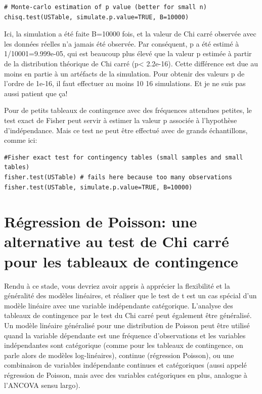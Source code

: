 \documentclass[12pt,]{book}
\begin{document}
\begin{verbatim}
# Monte-carlo estimation of p value (better for small n)
chisq.test(USTable, simulate.p.value=TRUE, B=10000)
\end{verbatim}

Ici, la simulation a été faite B=10000 fois, et la valeur de Chi carré
observée avec les données réelles n'a jamais été observée. Par
conséquent, p a été estimé à 1/10001=9.999e-05, qui est beaucoup
plus élevé que la valeur p estimée à partir de la distribution théorique
de Chi carré (p\textless{} 2.2e-16). Cette différence est due au moins en partie
à un artéfacts de la simulation. Pour obtenir des valeurs p de l'ordre de
1e-16, il faut effectuer au moins 10 16 simulations. Et je ne suis pas
aussi patient que ça!

Pour de petits tableaux de contingence avec des fréquences attendues
petites, le test exact de Fisher peut servir à estimer la valeur p associée
à l'hypothèse d'indépendance. Mais ce test ne peut être effectué avec
de grands échantillons, comme ici:

\begin{verbatim}
#Fisher exact test for contingency tables (small samples and small tables)
fisher.test(USTable) # fails here because too many observations
fisher.test(USTable, simulate.p.value=TRUE, B=10000)
\end{verbatim}

\hypertarget{ruxe9gression-de-poisson-une-alternative-au-test-de-chi-carruxe9-pour-les-tableaux-de-contingence}{%
\section{Régression de Poisson: une alternative au test de Chi carré pour les tableaux de contingence}\label{ruxe9gression-de-poisson-une-alternative-au-test-de-chi-carruxe9-pour-les-tableaux-de-contingence}}

Rendu à ce stade, vous devriez avoir appris à apprécier la flexibilité et
la généralité des modèles linéaires, et réaliser que le test de t est un cas
spécial d'un modèle linéaire avec une variable indépendante
catégorique. L'analyse des tableaux de contingence par le test du Chi
carré peut également être généralisé. Un modèle linéaire généralisé
pour une distribution de Poisson peut être utilisé quand la variable
dépendante est une fréquence d'observations et les variables
indépendantes sont catégorique (comme pour les tableaux de
contingence, on parle alors de modèles log-linéaires), continue
(régression Poisson), ou une combinaison de variables indépendante
continues et catégoriques (aussi appelé régression de Poisson, mais
avec des variables catégoriques en plus, analogue à l'ANCOVA sensu
largo).
\end{document}
